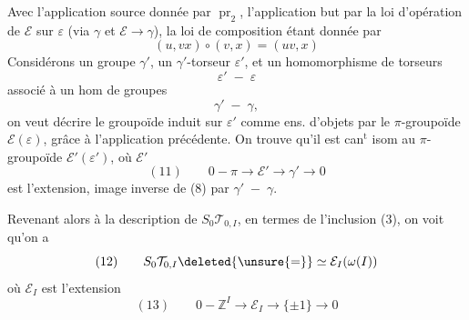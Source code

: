 Avec l'application source donnée par $\operatorname{pr}_2$, l'application but par la loi d'opération de $\mathcal E$ sur $\varepsilon$ (via $\gamma$ et $\mathcal E\longrightarrow\gamma$), la loi de composition étant donnée par
\[
(u,vx)\circ(v,x)=(uv,x)
\]
Considérons un groupe $\gamma'$, un  $\gamma'$-torseur $\varepsilon'$, et un homomorphisme de torseurs
\[
\varepsilon'\;-\;\varepsilon
\]
associé à un hom de groupes
\[
\gamma'\;-\;\gamma,
\]
on veut décrire le \inserted{$\pi$-}groupoïde induit sur $\varepsilon'$ comme ens. d'objets par le $\pi$-groupoïde $\mathcal E(\varepsilon)$, grâce à l'application précédente. On trouve qu'il est can$^{\mathrm t}$ isom au $\pi$-groupoïde $\mathcal E'(\varepsilon')$, où $\mathcal E'$
\[
(11)\qquad0-\pi\longrightarrow\mathcal E'\longrightarrow\gamma'\longrightarrow0
\]
est l'extension, image inverse de (8) par $\gamma'\;-\;\gamma$.

Revenant alors à la description de $S_0\mathcal T_{0,I}$, en termes de l'inclusion (3), on voit qu'on a
\[
(12)\qquad S_0\mathcal T_{0,I}\deleted{\unsure{=}}\simeq\mathcal E_I(\omega(I))
\]
où $\mathcal E_I$ est l'extension
\[
(13)\qquad0-\mathbb Z^I\longrightarrow\mathcal E_I\longrightarrow\{\pm1\}\longrightarrow0
\]
